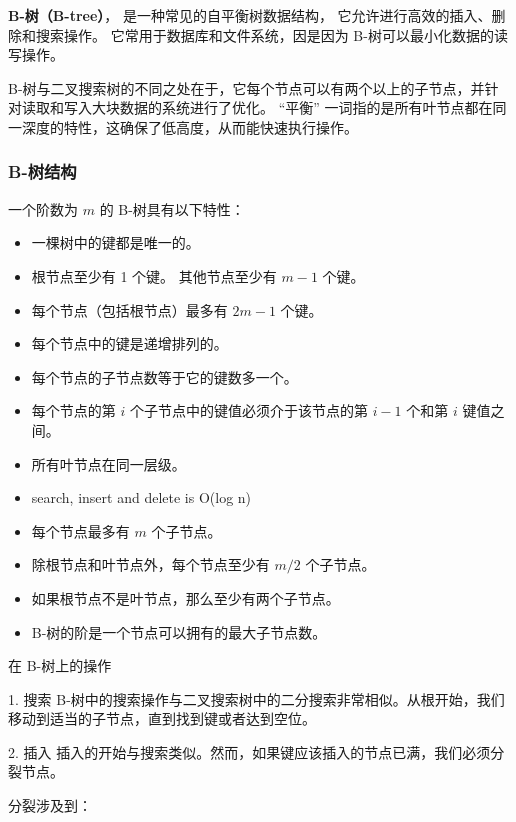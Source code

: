 
\begin{issues}
\issueDraft
\end{issues}


\textbf{B-树（B-tree）}， 是一种常见的自平衡树数据结构， 它允许进行高效的插入、删除和搜索操作。 它常用于数据库和文件系统，因是因为 B-树可以最小化数据的读写操作。

B-树与二叉搜索树的不同之处在于，它每个节点可以有两个以上的子节点，并针对读取和写入大块数据的系统进行了优化。 “平衡” 一词指的是所有叶节点都在同一深度的特性，这确保了低高度，从而能快速执行操作。

\subsubsection{B-树结构}
一个阶数为 $m$ 的 B-树具有以下特性：
\begin{itemize}
\item 一棵树中的键都是唯一的。
\item 根节点至少有 1 个键。 其他节点至少有 $m-1$ 个键。
\item 每个节点（包括根节点）最多有 $2m-1$ 个键。
\item 每个节点中的键是递增排列的。
\item 每个节点的子节点数等于它的键数多一个。
\item 每个节点的第 $i$ 个子节点中的键值必须介于该节点的第 $i-1$ 个和第 $i$ 键值之间。
\item 所有叶节点在同一层级。
\item search, insert and delete is O(log n)


\item 每个节点最多有 $m$ 个子节点。
\item 除根节点和叶节点外，每个节点至少有 $m/2$ 个子节点。
\item 如果根节点不是叶节点，那么至少有两个子节点。


\item B-树的阶是一个节点可以拥有的最大子节点数。
\end{itemize}


在 B-树上的操作

1. 搜索
B-树中的搜索操作与二叉搜索树中的二分搜索非常相似。从根开始，我们移动到适当的子节点，直到找到键或者达到空位。

2. 插入
插入的开始与搜索类似。然而，如果键应该插入的节点已满，我们必须分裂节点。

分裂涉及到：


